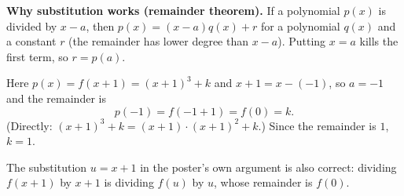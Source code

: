 \textbf{Why substitution works (remainder theorem).} If a polynomial $p(x)$ is divided by $x-a$, then $p(x)=(x-a)q(x)+r$ for a polynomial $q(x)$ and a constant $r$ (the remainder has lower degree than $x-a$). Putting $x=a$ kills the first term, so $r=p(a)$.

Here $p(x)=f(x+1)=(x+1)^3+k$ and $x+1=x-(-1)$, so $a=-1$ and the remainder is
\[
p(-1)=f(-1+1)=f(0)=k .
\]
(Directly: $(x+1)^3+k=(x+1)\cdot(x+1)^2+k$.) Since the remainder is $1$, $k=\boxed{1}$.

The substitution $u=x+1$ in the poster's own argument is also correct: dividing $f(x+1)$ by $x+1$ is dividing $f(u)$ by $u$, whose remainder is $f(0)$.
